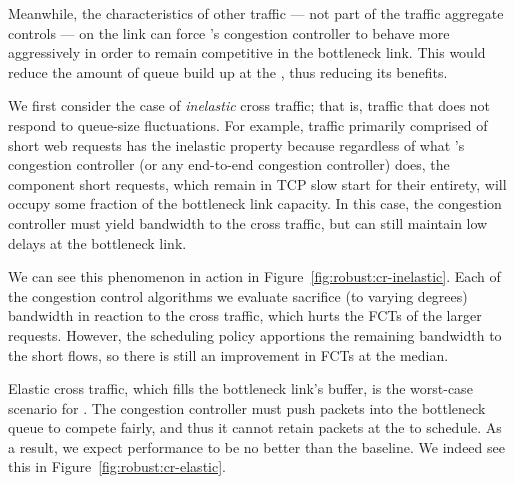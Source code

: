 



Meanwhile, the characteristics of other traffic --- not part of the traffic aggregate \name controls --- on the link can force \name's congestion controller to behave more aggressively in order to remain competitive in the bottleneck link. This would reduce the amount of queue build up at the \name, thus reducing its benefits.


 We first consider the case of \emph{inelastic} cross traffic; that is, traffic that does not respond to queue-size fluctuations.
For example, traffic primarily comprised of short web requests has the inelastic property because regardless of what \name's congestion controller (or any end-to-end congestion controller) does, the component short requests, which remain in TCP slow start for their entirety, will occupy some fraction of the bottleneck link capacity.
In this case, the congestion controller must yield bandwidth to the cross traffic, but can still maintain low delays at the bottleneck link.

We can see this phenomenon in action in Figure~\ref{fig:robust:cr-inelastic}. 
Each of the congestion control algorithms we evaluate sacrifice (to varying degrees) bandwidth in reaction to the cross traffic, which hurts the FCTs of the larger requests.
However, the scheduling policy apportions the remaining bandwidth to the short flows, so there is still an improvement in FCTs at the median.


 Elastic cross traffic, which fills the bottleneck link's buffer, is the worst-case scenario for \name.
The congestion controller must push packets into the bottleneck queue to compete fairly, and thus it cannot retain packets at the \inbox to schedule.
As a result, we expect performance to be no better than the baseline.
We indeed see this in Figure~\ref{fig:robust:cr-elastic}.


